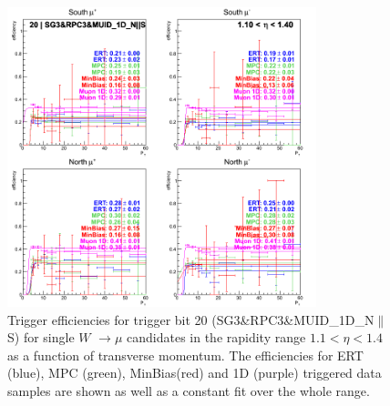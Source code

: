 \begin{figure}[ht]
\begin{center}
\includegraphics[width=0.8\textwidth]{./figures/run13_trigeffipt_eta0_trig20_lin.png}
\caption{\label{fig:run13_trigeffipt_eta0_nper0_trig20_lin} Trigger efficiencies for trigger bit 20 (SG3\&RPC3\&MUID\_1D\_N$\|$S) for single $W$ $\rightarrow \mu$ candidates in the rapidity range $ 1.1 < \eta < 1.4$ as a function of transverse momentum. The efficiencies for ERT (blue), MPC (green), MinBias(red) and 1D (purple) triggered data samples are shown as well as a constant fit over the whole range.}
\end{center}
\end{figure}
